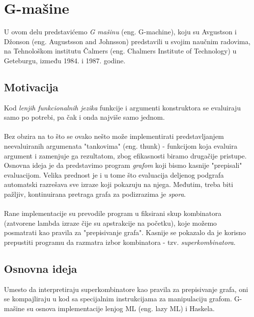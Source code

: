 \section{G-mašine}
\label{sec:Gmašine}

U ovom delu predstavićemo {\em G mašinu} (eng. G-machine), koju su Avgustson i Džonson (eng. Augustsson and Johnsson) predstavili u svojim naučnim radovima, na Tehnološkom institutu Čalmers (eng. Chalmers Institute of Technology) u Geteburgu, između 1984. i 1987. godine. 

\subsection{Motivacija}
Kod {\em lenjih funkcionalnih jezika} funkcije i argumenti konstruktora se evaluiraju samo po potrebi, pa čak i onda najviše samo jednom. \\
\\Bez obzira na to što se ovako nešto može implementirati predstavljanjem neevaluiranih argumenata "tankovima" (eng. thunk) - funkcijom koja evaluira argument i zamenjuje ga rezultatom, zbog efikasnosti biramo drugačije pristupe. \\Osnovna ideja je da predstavimo program {\em grafom} koji bismo kasnije "prepisali"  evaluacijom. Velika prednost je i u tome što evaluacija deljenog podgrafa automatski razrešava sve izraze koji pokazuju na njega. Međutim, treba biti pažljiv, kontinuirana pretraga grafa za podizrazima je {\em spora}. \\\\
Rane implementacije su prevodile program u fiksirani skup kombinatora (zatvorene lambda izraze čije su apstrakcije na početku), koje možemo posmatrati kao pravila za "prepisivanje grafa". Kasnije se pokazalo da je korisno prepustiti programu da razmatra izbor kombinatora - tzv. {\em superkombinatora}. \\ %


\subsection{Osnovna ideja} 
Umesto da interpretiraju superkombinatore kao pravila za prepisivanje grafa, oni se kompajliraju u kod sa specijalnim instrukcijama za manipulaciju grafom. G-mašine su osnova implementacije lenjog ML (eng. lazy ML) i Haskela. 

